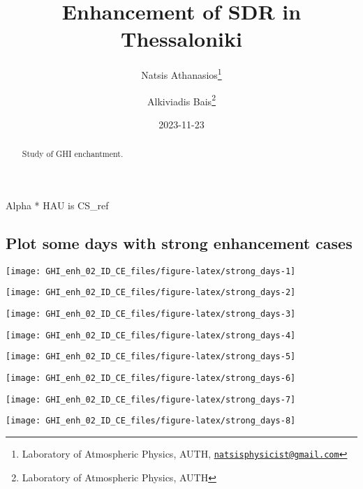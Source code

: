 \documentclass[
  10pt,
  a4paper,oneside]{article}
\title{Enhancement of SDR in Thessaloniki}
\author{Natsis Athanasios\footnote{Laboratory of Atmospheric Physics, AUTH, \href{mailto:natsisphysicist@gmail.com}{\nolinkurl{natsisphysicist@gmail.com}}} \and Alkiviadis Bais\footnote{Laboratory of Atmospheric Physics, AUTH}}
\date{2023-11-23}
\begin{document}
\maketitle
\begin{abstract}
Study of GHI enchantment.
\end{abstract}

{
\hypersetup{linkcolor=}
\setcounter{tocdepth}{4}
\tableofcontents
}
Alpha * HAU is CS\_ref

\hypertarget{plot-some-days-with-strong-enhancement-cases}{%
\subsection{Plot some days with strong enhancement cases}\label{plot-some-days-with-strong-enhancement-cases}}

\begin{center}\texttt{[image: GHI\_enh\_02\_ID\_CE\_files/figure-latex/strong\_days-1]} \end{center}

\begin{center}\texttt{[image: GHI\_enh\_02\_ID\_CE\_files/figure-latex/strong\_days-2]} \end{center}

\begin{center}\texttt{[image: GHI\_enh\_02\_ID\_CE\_files/figure-latex/strong\_days-3]} \end{center}

\begin{center}\texttt{[image: GHI\_enh\_02\_ID\_CE\_files/figure-latex/strong\_days-4]} \end{center}

\begin{center}\texttt{[image: GHI\_enh\_02\_ID\_CE\_files/figure-latex/strong\_days-5]} \end{center}

\begin{center}\texttt{[image: GHI\_enh\_02\_ID\_CE\_files/figure-latex/strong\_days-6]} \end{center}

\begin{center}\texttt{[image: GHI\_enh\_02\_ID\_CE\_files/figure-latex/strong\_days-7]} \end{center}

\begin{center}\texttt{[image: GHI\_enh\_02\_ID\_CE\_files/figure-latex/strong\_days-8]} \end{center}
\end{document}
